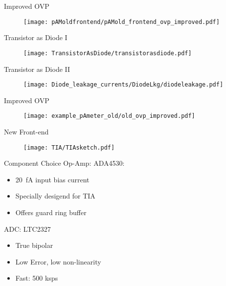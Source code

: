\documentclass[t]{beamer}
\begin{document}
\begin{frame}[c]{Improved OVP}
	\begin{figure}
		\texttt{[image: pAMoldfrontend/pAMold\_frontend\_ovp\_improved.pdf]}
	\end{figure}
\end{frame}

\begin{frame}[c]{Transistor as Diode I}
	\begin{figure}
		\texttt{[image: TransistorAsDiode/transistorasdiode.pdf]}
	\end{figure}
\end{frame}

\begin{frame}[c]{Transistor as Diode II}
	\begin{figure}
		\texttt{[image: Diode\_leakage\_currents/DiodeLkg/diodeleakage.pdf]}
	\end{figure}
\end{frame}

\begin{frame}[c]{Improved OVP}
	\begin{figure}
		\texttt{[image: example\_pAmeter\_old/old\_ovp\_improved.pdf]}
	\end{figure}
\end{frame}

\begin{frame}[c]{New Front-end}
	\begin{figure}
		\texttt{[image: TIA/TIAsketch.pdf]}
	\end{figure}
\end{frame}

\begin{frame}[c]{Component Choice}
Op-Amp: 
ADA4530:
\begin{itemize}
	\item \SI{20}{\femto\ampere} input bias current
	\item Specially desigend for TIA
	\item Offers guard ring buffer
\end{itemize}
ADC:
LTC2327
\begin{itemize}
	\item True bipolar 
	\item Low Error, low non-linearity
	\item Fast: 500 ksps
\end{itemize}

\end{frame}
\end{document}
